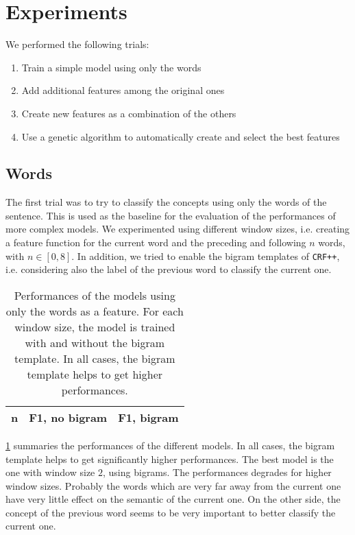\section{Experiments}
\label{sec:experiments}

We performed the following trials:
\begin{enumerate}
    \item Train a simple model using only the words
    \item Add additional features among the original ones
    \item Create new features as a combination of the others
    \item Use a genetic algorithm to automatically create and select the best features
\end{enumerate}

\subsection{Words}
\label{subsection:words}
The first trial was to try to classify the concepts using only the words of the sentence.
This is used as the baseline for the evaluation of the performances of more complex models.
We experimented using different window sizes, i.e. creating a feature function for the current word and the preceding and following $n$ words, with $n \in [0,8]$.
In addition, we tried to enable the bigram templates of \texttt{CRF++}, i.e. considering also the label of the previous word to classify the current one. 

\begin{table}[t!]
	\centering
    \begin{tabular}{ c c c }
    	\toprule
    		\multicolumn{1}{c}{n} & \multicolumn{1}{c}{F1, no bigram} & \multicolumn{1}{c}{F1, bigram} \\
    	\midrule
            
    	\bottomrule
	\end{tabular}
    \caption{Performances of the models using only the words as a feature. For each window size, the model is trained with and without the bigram template. In all cases, the bigram template helps to get higher performances.}
	\label{tab:words}
\end{table}

\cref{tab:words} summaries the performances of the different models.
In all cases, the bigram template helps to get significantly higher performances.
The best model is the one with window size $2$, using bigrams.
The performances degrades for higher window sizes.
Probably the words which are very far away from the current one have very little effect on the semantic of the current one.
On the other side, the concept of the previous word seems to be very important to better classify the current one.

